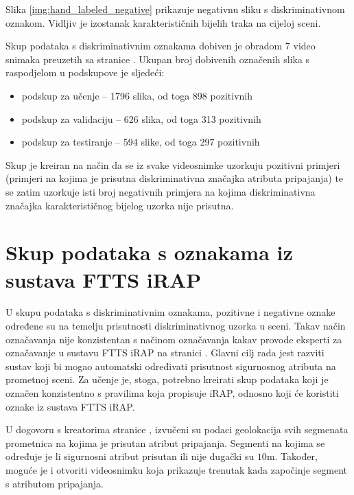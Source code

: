 \documentclass[times, utf8, diplomski, numeric]{fer}
\begin{document}
\noindent Slika \ref{img:hand_labeled_negative} prikazuje negativnu sliku s diskriminativnom oznakom.
Vidljiv je izostanak karakterističnih bijelih traka na cijeloj sceni.

Skup podataka s diskriminativnim oznakama dobiven je obradom 7 video snimaka preuzetih sa stranice \citep{url:ftts_irap}. 
Ukupan broj dobivenih označenih slika s raspodjelom u podskupove je sljedeći:
\begin{itemize}
 \item podskup za učenje -- 1796 slika, od toga 898 pozitivnih
 \item podskup za validaciju -- 626 slika, od toga 313 pozitivnih
 \item podskup za testiranje -- 594 slike, od toga 297 pozitivnih
\end{itemize}

\noindent Skup je kreiran na način da se iz svake videosnimke uzorkuju pozitivni primjeri (primjeri na kojima je prisutna diskriminativna značajka atributa pripajanja) te se zatim uzorkuje isti broj negativnih primjera na kojima diskriminativna značajka karakterističnog bijelog uzorka nije prisutna.

\section{Skup podataka s oznakama iz sustava FTTS iRAP}
U skupu podataka s diskriminativnim oznakama, pozitivne i negativne oznake određene su na temelju prisutnosti diskriminativnog uzorka u sceni. 
Takav način označavanja nije konzistentan s načinom označavanja kakav provode eksperti za označavanje u sustavu FTTS iRAP na stranici \citep{url:ftts_irap}.
Glavni cilj rada jest razviti sustav koji bi mogao automatski određivati prisutnost sigurnosnog atributa na prometnoj sceni. 
Za učenje je, stoga, potrebno kreirati skup podataka koji je označen konzistentno s pravilima koja propisuje iRAP, odnosno koji će koristiti oznake iz sustava FTTS iRAP.

U dogovoru s kreatorima stranice \citep{url:ftts_irap}, izvučeni su podaci geolokacija svih segmenata prometnica na kojima je prisutan atribut pripajanja. 
Segmenti na kojima se određuje je li sigurnosni atribut prisutan ili nije dugački su $10$m.
Također, moguće je i otvoriti videosnimku koja prikazuje trenutak kada započinje segment s atributom pripajanja.
\end{document}
